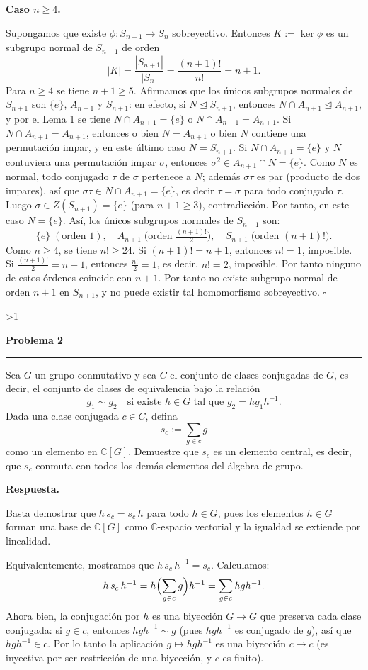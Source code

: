 \documentclass[10pt,a4paper]{article}
\newcommand{\CC}{\mathbb{C}}
\newcommand{\inlinehead}[2][repblue]{%
  \par\smallskip
  {\color{#1}\bfseries #2.}\hspace{0.45em}%
}
\newcommand{\blockhead}[2][repteal]{%
  \par\smallskip
  {\color{#1}\bfseries #2.}\par\nobreak\smallskip
}
\newcommand{\answer}{\inlinehead{Respuesta}}
\newcommand{\subhead}[1]{\blockhead{#1}}
\newcounter{probcnt}
\newcommand{\problem}[2]{%
  \stepcounter{probcnt}%
  \ifnum\value{probcnt}>1\newpage\fi
  \par\vspace{0.25em}
  {\large\bfseries\color{repblue} Problema #1}\par
  {\color{repline}\rule{\linewidth}{0.55pt}}\par
  \begin{tcolorbox}[
    breakable,
    colback=white,
    colframe=repline,
    borderline west={1.6pt}{0pt}{repteal},
    left=0.7em,
    right=0.7em,
    top=0.35em,
    bottom=0.3em,
    before skip=0.35em,
    after skip=0.45em
  ]
    #2
  \end{tcolorbox}
}
\begin{document}
\subhead{Caso $n\ge 4$}
Supongamos que existe $\phi\colon S_{n+1}\to S_n$ sobreyectivo.
Entonces $K:=\ker\phi$ es un subgrupo normal de $S_{n+1}$ de orden
\[
  |K|=\frac{|S_{n+1}|}{|S_n|}=\frac{(n+1)!}{n!}=n+1.
\]
Para $n\ge 4$ se tiene $n+1\ge 5$. Afirmamos que los únicos subgrupos
normales de $S_{n+1}$ son $\{e\}$, $A_{n+1}$ y $S_{n+1}$: en efecto,
si $N\trianglelefteq S_{n+1}$, entonces $N\cap A_{n+1}\trianglelefteq A_{n+1}$,
 y por el Lema 1 se tiene $N\cap A_{n+1}=\{e\}$ o $N\cap A_{n+1}=A_{n+1}$. Si $N\cap A_{n+1}=A_{n+1}$,
 entonces o bien $N=A_{n+1}$ o bien $N$ contiene una permutación impar, y en este último caso $N=S_{n+1}$.
 Si $N\cap A_{n+1}=\{e\}$ y $N$ contuviera una permutación impar $\sigma$, entonces $\sigma^2\in A_{n+1}\cap N=\{e\}$.
 Como $N$ es normal, todo conjugado $\tau$ de $\sigma$ pertenece a $N$;
 además $\sigma\tau$ es par (producto de dos impares), así que
 $\sigma\tau\in N\cap A_{n+1}=\{e\}$, es decir $\tau=\sigma$
 para todo conjugado $\tau$. Luego $\sigma\in Z(S_{n+1})=\{e\}$
 (para $n+1\ge 3$), contradicción. Por tanto, en este caso $N=\{e\}$.
 Así, los únicos subgrupos normales de $S_{n+1}$ son:
\[
  \{e\}\;(\text{orden }1),\quad
  A_{n+1}\;\bigl(\text{orden }\tfrac{(n+1)!}{2}\bigr),\quad
  S_{n+1}\;\bigl(\text{orden }(n+1)!\bigr).
\]
Como $n\ge 4$, se tiene $n!\ge 24$. Si $(n+1)!=n+1$, entonces
$n!=1$, imposible. Si $\tfrac{(n+1)!}{2}=n+1$, entonces
$\tfrac{n!}{2}=1$, es decir, $n!=2$, imposible. Por tanto ninguno
de estos órdenes coincide con $n+1$. Por tanto no existe subgrupo
normal de orden $n+1$ en $S_{n+1}$, y no puede existir tal homomorfismo
sobreyectivo. \hfill$\square$

\problem{2}{%
Sea $G$ un grupo conmutativo y sea $C$ el conjunto de clases conjugadas
de $G$, es decir, el conjunto de clases de equivalencia bajo la relación
\[
  g_1 \sim g_2 \quad \text{si existe } h \in G \text{ tal que } g_2 = h g_1 h^{-1}.
\]
Dada una clase conjugada $c \in C$, defina
\[
  s_c := \sum_{g \in c} g
\]
como un elemento en $\CC[G]$. Demuestre que $s_c$ es un elemento central,
es decir, que $s_c$ conmuta con todos los demás elementos del álgebra de grupo.
}

\answer
Basta demostrar que $h\,s_c = s_c\,h$ para todo $h\in G$,
pues los elementos $h\in G$ forman una base de $\CC[G]$ como $\CC$-espacio vectorial
y la igualdad se extiende por linealidad.

Equivalentemente, mostramos que $h\,s_c\,h^{-1}=s_c$.
Calculamos:
\[
  h\,s_c\,h^{-1}
  = h\Bigl(\sum_{g\in c}g\Bigr)h^{-1}
  = \sum_{g\in c}hgh^{-1}.
\]
Ahora bien, la conjugación por $h$ es una biyección $G\to G$
que preserva cada clase conjugada: si $g\in c$, entonces $hgh^{-1}\sim g$
(pues $hgh^{-1}$ es conjugado de $g$), así que $hgh^{-1}\in c$.
Por lo tanto la aplicación $g\mapsto hgh^{-1}$ es una biyección $c\to c$
(es inyectiva por ser restricción de una biyección, y $c$ es finito).
\end{document}
